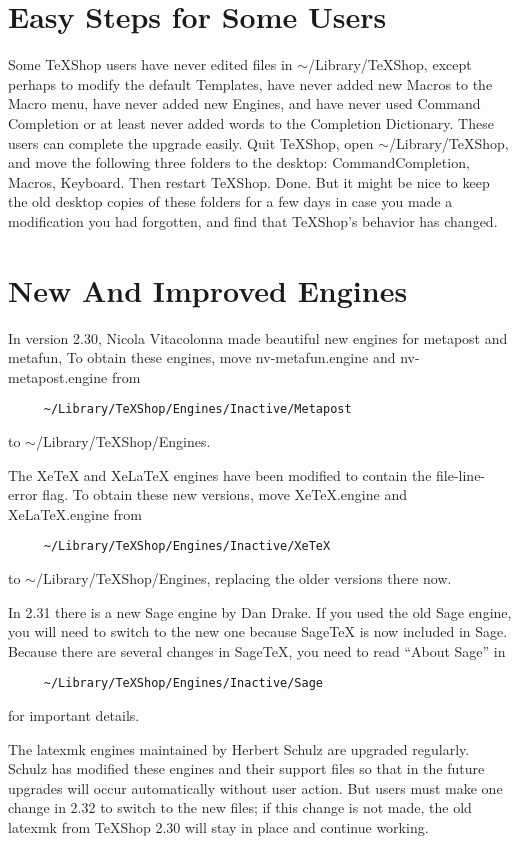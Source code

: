 \documentclass[11pt, oneside]{amsart}
\begin{document}
\section{Easy Steps for Some Users}

Some TeXShop users have never edited files in $\sim$/Library/TeXShop, except perhaps to modify the default Templates, have never added new Macros to the Macro menu, have never added  new Engines, and  have never used Command Completion or at least never added words to the Completion Dictionary.
These users can complete the upgrade easily. Quit TeXShop, open $\sim$/Library/TeXShop, and move the following three folders to the desktop:
CommandCompletion, Macros, Keyboard. Then restart TeXShop. Done. But it might be nice to keep the old desktop copies of these folders for a few days in case you made a modification you had forgotten, and find that TeXShop's behavior has changed.

\section{New And Improved Engines}

In version 2.30, Nicola Vitacolonna made beautiful new engines for metapost and metafun,  To obtain these engines, move nv-metafun.engine and nv-metapost.engine from 
\begin{verbatim}
     ~/Library/TeXShop/Engines/Inactive/Metapost
\end{verbatim}
to $\sim$/Library/TeXShop/Engines.

The XeTeX and XeLaTeX engines have been modified to contain the file-line-error flag. To obtain these new versions, move XeTeX.engine and XeLaTeX.engine from
\begin{verbatim}
     ~/Library/TeXShop/Engines/Inactive/XeTeX
\end{verbatim}
to $\sim$/Library/TeXShop/Engines, replacing the older versions there now.

In 2.31 there is a new Sage engine by Dan Drake. If you used the old Sage engine, you will need to switch to the new one because SageTeX is now included in Sage. Because there are several changes in SageTeX, you need to read ``About Sage'' in 
\begin{verbatim}
     ~/Library/TeXShop/Engines/Inactive/Sage
\end{verbatim}
for important details.

The latexmk engines maintained by Herbert Schulz are upgraded regularly. Schulz has modified these engines and their support files so that in the future upgrades will occur automatically without user action. But users must make one change in 2.32 to switch to the new files; if this change is not made, the old latexmk from TeXShop 2.30 will stay in place and continue working. 
\end{document}
